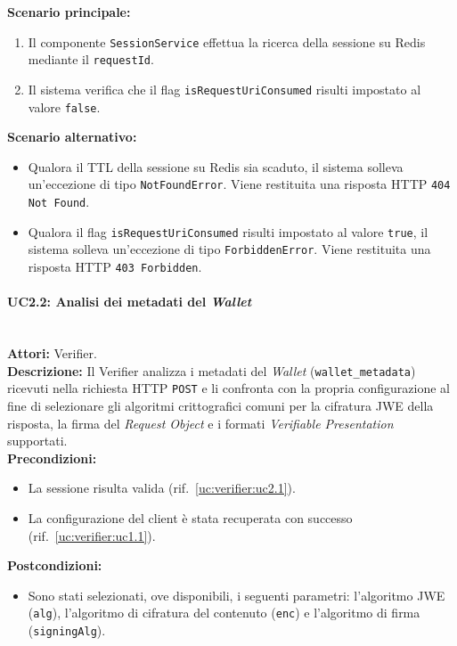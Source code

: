 \noindent\textbf{Scenario principale:}
\begin{enumerate}
    \item Il componente \texttt{SessionService} effettua la ricerca della sessione su Redis mediante il \texttt{requestId}.
    \item Il sistema verifica che il flag \texttt{isRequestUriConsumed} risulti impostato al valore \texttt{false}.
\end{enumerate}

\noindent\textbf{Scenario alternativo:}
\begin{itemize}
    \item Qualora il TTL della sessione su Redis sia scaduto, il sistema solleva un'eccezione di tipo \texttt{NotFoundError}. Viene restituita una risposta HTTP \texttt{404 Not Found}.
    \item Qualora il flag \texttt{isRequestUriConsumed} risulti impostato al valore \texttt{true}, il sistema solleva un'eccezione di tipo \texttt{ForbiddenError}. Viene restituita una risposta HTTP \texttt{403 Forbidden}.
\end{itemize}

\paragraph{\large\bfseries UC2.2: Analisi dei metadati del \textit{Wallet}}
\label{uc:verifier:uc2.2}
\mbox{}\\
\noindent\textbf{Attori:} Verifier.
\\
\noindent\textbf{Descrizione:} Il Verifier analizza i metadati del \textit{Wallet} (\texttt{wallet\_\allowbreak{}metadata}) ricevuti nella richiesta HTTP \texttt{POST} e li confronta con la propria configurazione al fine di selezionare gli algoritmi crittografici comuni per la cifratura JWE della risposta, la firma del \textit{Request Object} e i formati \textit{Verifiable Presentation} supportati.
\\
\noindent\textbf{Precondizioni:}
\begin{itemize}
    \item La sessione risulta valida (rif.\ \ref{uc:verifier:uc2.1}).
    \item La configurazione del client è stata recuperata con successo (rif.\ \ref{uc:verifier:uc1.1}).
\end{itemize}
\noindent\textbf{Postcondizioni:}
\begin{itemize}
    \item Sono stati selezionati, ove disponibili, i seguenti parametri: l'algoritmo JWE (\texttt{alg}), l'algoritmo di cifratura del contenuto (\texttt{enc}) e l'algoritmo di firma (\texttt{signingAlg}).
\end{itemize}

